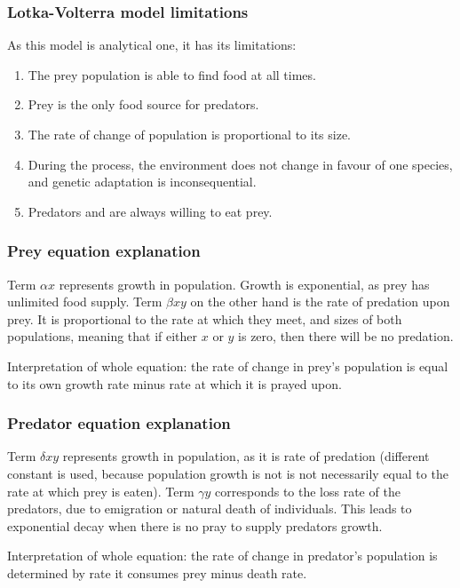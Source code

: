 \subsubsection{Lotka-Volterra model limitations}
\label{lotkaVolterraLimitations}
As this model is analytical one, it has its limitations: \cite{lotka_volterra_wiki}
\begin{enumerate}
    \item The prey population is able to find food at all times.
    \item Prey is the only food source for predators.
    \item The rate of change of population is proportional to its size.
    \item During the process, the environment does not change in favour of one species, and genetic adaptation is inconsequential.
    \item Predators and are always willing to eat prey.
\end{enumerate}

\subsubsection{Prey equation explanation}
Term $\alpha x$ represents growth in population. Growth is exponential, as prey has unlimited food supply.
Term $\beta xy$ on the other hand is the rate of predation upon prey. It is proportional to the rate at which they meet, and sizes of both populations, meaning that if either $x$ or $y$ is zero, then there will be no predation.

Interpretation of whole equation: the rate of change in prey's population is equal to its own growth rate minus rate at which it is prayed upon.

\subsubsection{Predator equation explanation}
Term $\delta xy$ represents growth in population, as it is rate of predation (different constant is used, because population growth is not is not necessarily equal to the rate at which prey is eaten).
Term $\gamma y$ corresponds to the loss rate of the predators, due to emigration or natural death of individuals. This leads to exponential decay when there is no pray to supply predators growth.

Interpretation of whole equation: the rate of change in predator's population is determined by rate it consumes prey minus death rate.

